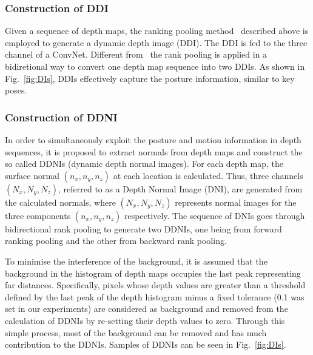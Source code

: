 \documentclass[10pt, a4paper, conference]{IEEEtran}
\begin{document}
\subsubsection{Construction of DDI}
Given a sequence of depth maps, the ranking pooling method~\cite{bilen2016dynamic} described above is employed to generate a dynamic depth image (DDI).  The DDI is fed to the three channel of a ConvNet. Different from~\cite{bilen2016dynamic} the rank pooling is applied in a bidiretional way to convert one depth map sequence into two DDIs. As shown in Fig.~\ref{fig:DIs}, DDIs effectively capture the posture information, similar to key poses.

\subsubsection{Construction of DDNI}

In order to simultaneously exploit the posture and motion information in depth sequences, it is proposed to extract normals from depth maps and construct the so called DDNIs (dynamic depth normal images). For each depth map, the surface normal $(n_x,n_y,n_z)$ at each location is calculated. Thus, three channels $(N_x,N_y,N_z)$, referred to as a Depth Normal Image (DNI), are generated from the calculated normals, where $(N_x,N_y,N_z)$ represents normal images for the three components $(n_x,n_y,n_z)$ respectively. The sequence of DNIs goes through bidirectional rank pooling to generate two DDNIs, one  being from forward ranking pooling and the other from backward rank pooling.

To minimise the interference of the background, it is assumed that the background in the histogram of depth maps occupies the last peak representing far distances. Specifically, pixels whose depth values are greater than a threshold defined by the last peak of the depth histogram minus a fixed tolerance (0.1 was set in our experiments) are considered as background and removed from the calculation of DDNIs by re-setting their depth values to zero. Through this simple process, most of the background can be removed and has much contribution to the DDNIs.  Samples of DDNIs can be seen in Fig.~\ref{fig:DIs}.
\end{document}
